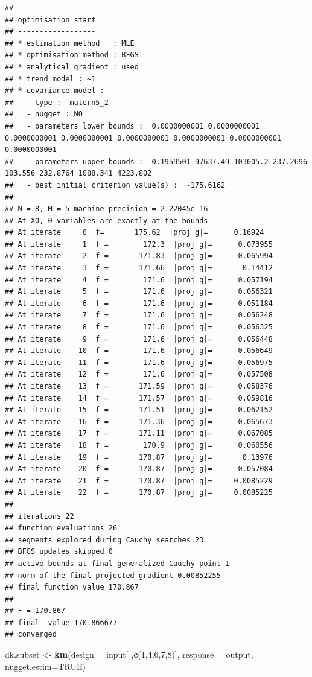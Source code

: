 \documentclass[
  10pt,
]{article}
\newenvironment{Shaded}{\begin{snugshade}}{\end{snugshade}}
\newcommand{\AttributeTok}[1]{\textcolor[rgb]{0.13,0.29,0.53}{#1}}
\newcommand{\ConstantTok}[1]{\textcolor[rgb]{0.56,0.35,0.01}{#1}}
\newcommand{\DecValTok}[1]{\textcolor[rgb]{0.00,0.00,0.81}{#1}}
\newcommand{\FunctionTok}[1]{\textcolor[rgb]{0.13,0.29,0.53}{\textbf{#1}}}
\newcommand{\NormalTok}[1]{#1}
\newcommand{\OtherTok}[1]{\textcolor[rgb]{0.56,0.35,0.01}{#1}}
\begin{document}
\begin{verbatim}
## 
## optimisation start
## ------------------
## * estimation method   : MLE 
## * optimisation method : BFGS 
## * analytical gradient : used
## * trend model : ~1
## * covariance model : 
##   - type :  matern5_2 
##   - nugget : NO
##   - parameters lower bounds :  0.0000000001 0.0000000001 0.0000000001 0.0000000001 0.0000000001 0.0000000001 0.0000000001 0.0000000001 
##   - parameters upper bounds :  0.1959501 97637.49 103605.2 237.2696 103.556 232.8764 1088.341 4223.802 
##   - best initial criterion value(s) :  -175.6162 
## 
## N = 8, M = 5 machine precision = 2.22045e-16
## At X0, 0 variables are exactly at the bounds
## At iterate     0  f=       175.62  |proj g|=      0.16924
## At iterate     1  f =        172.3  |proj g|=      0.073955
## At iterate     2  f =       171.83  |proj g|=      0.065994
## At iterate     3  f =       171.66  |proj g|=       0.14412
## At iterate     4  f =        171.6  |proj g|=      0.057194
## At iterate     5  f =        171.6  |proj g|=      0.056321
## At iterate     6  f =        171.6  |proj g|=      0.051184
## At iterate     7  f =        171.6  |proj g|=      0.056248
## At iterate     8  f =        171.6  |proj g|=      0.056325
## At iterate     9  f =        171.6  |proj g|=      0.056448
## At iterate    10  f =        171.6  |proj g|=      0.056649
## At iterate    11  f =        171.6  |proj g|=      0.056975
## At iterate    12  f =        171.6  |proj g|=      0.057508
## At iterate    13  f =       171.59  |proj g|=      0.058376
## At iterate    14  f =       171.57  |proj g|=      0.059816
## At iterate    15  f =       171.51  |proj g|=      0.062152
## At iterate    16  f =       171.36  |proj g|=      0.065673
## At iterate    17  f =       171.11  |proj g|=      0.067085
## At iterate    18  f =        170.9  |proj g|=      0.060556
## At iterate    19  f =       170.87  |proj g|=       0.13976
## At iterate    20  f =       170.87  |proj g|=      0.057084
## At iterate    21  f =       170.87  |proj g|=     0.0085229
## At iterate    22  f =       170.87  |proj g|=     0.0085225
## 
## iterations 22
## function evaluations 26
## segments explored during Cauchy searches 23
## BFGS updates skipped 0
## active bounds at final generalized Cauchy point 1
## norm of the final projected gradient 0.00852255
## final function value 170.867
## 
## F = 170.867
## final  value 170.866677 
## converged
\end{verbatim}

\begin{Shaded}
\begin{Highlighting}[]
\NormalTok{dk.subset }\OtherTok{\textless{}{-}} \FunctionTok{km}\NormalTok{(}\AttributeTok{design =}\NormalTok{ input[ ,}\FunctionTok{c}\NormalTok{(}\DecValTok{1}\NormalTok{,}\DecValTok{4}\NormalTok{,}\DecValTok{6}\NormalTok{,}\DecValTok{7}\NormalTok{,}\DecValTok{8}\NormalTok{)], }\AttributeTok{response =}\NormalTok{ output,}
                \AttributeTok{nugget.estim=}\ConstantTok{TRUE}\NormalTok{)}
\end{Highlighting}
\end{Shaded}
\end{document}
